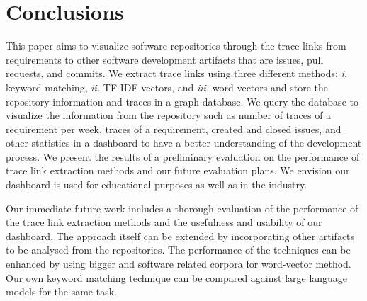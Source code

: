 \section{Conclusions}
\label{sec:conc}

This paper aims to visualize software repositories through the trace links from requirements to other software development artifacts that are issues, pull requests, and commits. We extract trace links using three different methods: \emph{i.} keyword matching, \emph{ii.} TF-IDF vectors, and \emph{iii.} word vectors and store the repository information and traces in a graph database. We query the database to visualize the information from the repository such as number of traces of a requirement per week, traces of a requirement, created and closed issues, and other statistics in a dashboard to have a better understanding of the development process. We present the results of a preliminary evaluation on the performance of trace link extraction methods and our future evaluation plans. We envision our dashboard is used for educational purposes as well as in the industry.

Our immediate future work includes a thorough evaluation of the performance of the trace link extraction methods and the usefulness and usability of our dashboard. The approach itself can be extended by incorporating other artifacts to be analysed from the repositories. The performance of the techniques can be enhanced by using bigger and software related corpora for word-vector method. Our own keyword matching technique can be compared against large language models for the same task.



